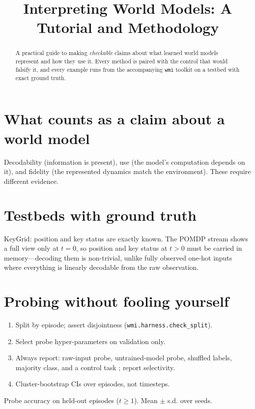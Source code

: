 \documentclass[11pt]{article}
\title{Interpreting World Models: A Tutorial and Methodology}
\author{\todo{authors}}
\newcommand{\todo}[1]{\textcolor{red}{[TODO: #1]}}
\begin{document}
\maketitle

\begin{abstract}
A practical guide to making \emph{checkable} claims about what learned world models represent and how they use it.
Every method is paired with the control that would falsify it, and every example runs from the accompanying
\texttt{wmi} toolkit on a testbed with exact ground truth.
\end{abstract}

\section{What counts as a claim about a world model}
Decodability (information is present), use (the model's computation depends on it), and fidelity
(the represented dynamics match the environment). These require different evidence.

\section{Testbeds with ground truth}
KeyGrid: position and key status are exactly known. The POMDP stream shows a full view only at $t=0$, so
position and key status at $t>0$ must be carried in memory---decoding them is non-trivial, unlike
fully observed one-hot inputs where everything is linearly decodable from the raw observation.

\section{Probing without fooling yourself}
\begin{enumerate}
\item Split by episode; assert disjointness (\texttt{wmi.harness.check\_split}).
\item Select probe hyper-parameters on validation only.
\item Always report: raw-input probe, untrained-model probe, shuffled labels, majority class, and a
      control task \citep{hewitt2019control}; report selectivity.
\item Cluster-bootstrap CIs over episodes, not timesteps.
\end{enumerate}
\begin{table}[h]\centering\scriptsize
\IfFileExists{generated/probe_table.tex}{}{\todo{run scripts/run\_probes.py}}
\caption{Probe accuracy on held-out episodes ($t\ge1$). Mean $\pm$ s.d. over seeds.}
\end{table}
\end{document}
